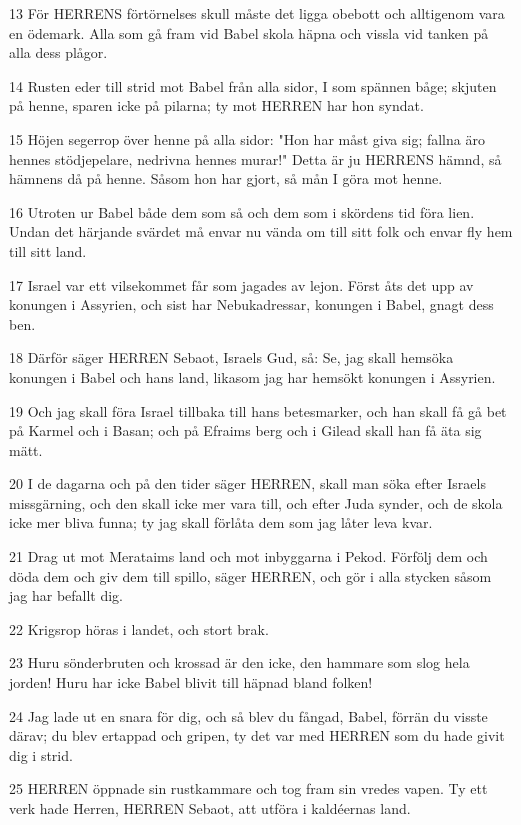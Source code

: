 \par 13 För HERRENS förtörnelses skull måste det ligga obebott och alltigenom vara en ödemark. Alla som gå fram vid Babel skola häpna och vissla vid tanken på alla dess plågor.
\par 14 Rusten eder till strid mot Babel från alla sidor, I som spännen båge; skjuten på henne, sparen icke på pilarna; ty mot HERREN har hon syndat.
\par 15 Höjen segerrop över henne på alla sidor: "Hon har måst giva sig; fallna äro hennes stödjepelare, nedrivna hennes murar!" Detta är ju HERRENS hämnd, så hämnens då på henne. Såsom hon har gjort, så mån I göra mot henne.
\par 16 Utroten ur Babel både dem som så och dem som i skördens tid föra lien. Undan det härjande svärdet må envar nu vända om till sitt folk och envar fly hem till sitt land.
\par 17 Israel var ett vilsekommet får som jagades av lejon. Först åts det upp av konungen i Assyrien, och sist har Nebukadressar, konungen i Babel, gnagt dess ben.
\par 18 Därför säger HERREN Sebaot, Israels Gud, så: Se, jag skall hemsöka konungen i Babel och hans land, likasom jag har hemsökt konungen i Assyrien.
\par 19 Och jag skall föra Israel tillbaka till hans betesmarker, och han skall få gå bet på Karmel och i Basan; och på Efraims berg och i Gilead skall han få äta sig mätt.
\par 20 I de dagarna och på den tider säger HERREN, skall man söka efter Israels missgärning, och den skall icke mer vara till, och efter Juda synder, och de skola icke mer bliva funna; ty jag skall förlåta dem som jag låter leva kvar.
\par 21 Drag ut mot Merataims land och mot inbyggarna i Pekod. Förfölj dem och döda dem och giv dem till spillo, säger HERREN, och gör i alla stycken såsom jag har befallt dig.
\par 22 Krigsrop höras i landet, och stort brak.
\par 23 Huru sönderbruten och krossad är den icke, den hammare som slog hela jorden! Huru har icke Babel blivit till häpnad bland folken!
\par 24 Jag lade ut en snara för dig, och så blev du fångad, Babel, förrän du visste därav; du blev ertappad och gripen, ty det var med HERREN som du hade givit dig i strid.
\par 25 HERREN öppnade sin rustkammare och tog fram sin vredes vapen. Ty ett verk hade Herren, HERREN Sebaot, att utföra i kaldéernas land.
